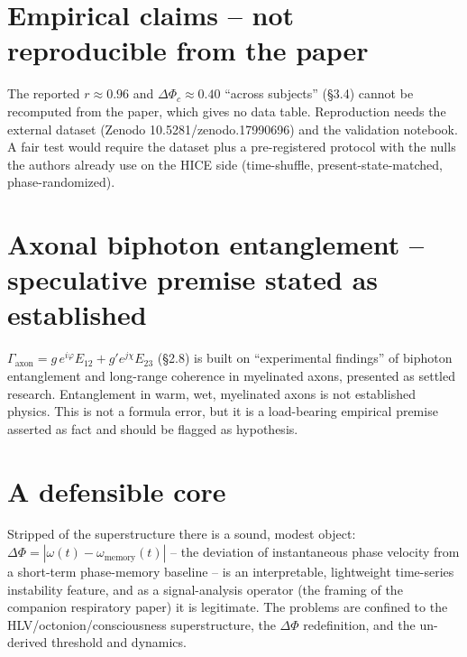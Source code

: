 \section{Empirical claims -- not reproducible from the paper}
The reported $r\approx0.96$ and $\Delta\Phi_c\approx0.40$ ``across subjects'' (\S3.4)
cannot be recomputed from the paper, which gives no data table. Reproduction needs the
external dataset (Zenodo 10.5281/zenodo.17990696) and the validation notebook. A fair
test would require the dataset plus a pre-registered protocol with the nulls the authors
already use on the HICE side (time-shuffle, present-state-matched, phase-randomized).

\section{Axonal biphoton entanglement -- speculative premise stated as established}
$\Gamma_{\text{axon}}=g\,e^{i\varphi}E_{12}+g'e^{j\chi}E_{23}$ (\S2.8) is built on
``experimental findings'' of biphoton entanglement and long-range coherence in myelinated
axons, presented as settled research. Entanglement in warm, wet, myelinated axons is not
established physics. This is not a formula error, but it is a load-bearing empirical
premise asserted as fact and should be flagged as hypothesis.

\section{A defensible core}
Stripped of the superstructure there is a sound, modest object:
$\Delta\Phi=|\omega(t)-\omega_{\text{memory}}(t)|$ -- the deviation of instantaneous phase
velocity from a short-term phase-memory baseline -- is an interpretable, lightweight
time-series instability feature, and as a signal-analysis operator (the framing of the
companion respiratory paper) it is legitimate. The problems are confined to the
HLV/octonion/consciousness superstructure, the $\Delta\Phi$ redefinition, and the
un-derived threshold and dynamics.

